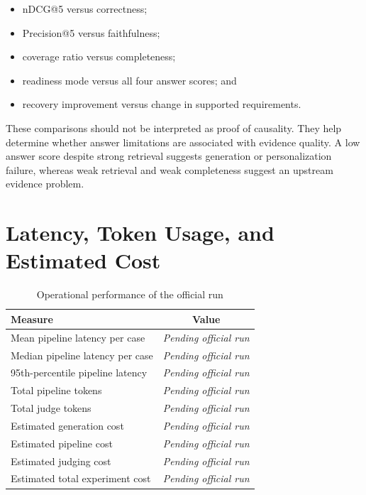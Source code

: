 \begin{itemize}
    \item nDCG@5 versus correctness;
    \item Precision@5 versus faithfulness;
    \item coverage ratio versus completeness;
    \item readiness mode versus all four answer scores; and
    \item recovery improvement versus change in supported requirements.
\end{itemize}

These comparisons should not be interpreted as proof of causality. They help
determine whether answer limitations are associated with evidence quality. A
low answer score despite strong retrieval suggests generation or personalization
failure, whereas weak retrieval and weak completeness suggest an upstream
evidence problem.

\section{Latency, Token Usage, and Estimated Cost}

\begin{table}[H]
\centering
\caption{Operational performance of the official run}
\label{tab:efficiency-results}
\begin{tabular}{lc}
\hline
\textbf{Measure} & \textbf{Value} \\
\hline
Mean pipeline latency per case & \textit{Pending official run} \\
Median pipeline latency per case & \textit{Pending official run} \\
95th-percentile pipeline latency & \textit{Pending official run} \\
Total pipeline tokens & \textit{Pending official run} \\
Total judge tokens & \textit{Pending official run} \\
Estimated generation cost & \textit{Pending official run} \\
Estimated pipeline cost & \textit{Pending official run} \\
Estimated judging cost & \textit{Pending official run} \\
Estimated total experiment cost & \textit{Pending official run} \\
\hline
\end{tabular}
\end{table}

